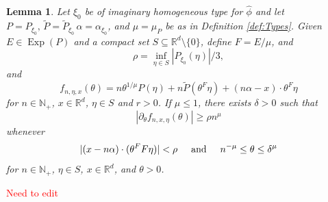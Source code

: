\documentclass[11pt]{article}
\newtheorem{lemma}[theorem]{Lemma}
\newcommand\Exp{\operatorname{Exp}}
\begin{document}
\begin{lemma}\label{lem:LwrBndDerivF}
Let $\xi_0$ be of imaginary homogeneous type for $\widehat{\phi}$ and let $P=P_{\xi_0},\,\widetilde{P}=\widetilde{P}_{\xi_0}\,\alpha=\alpha_{\xi_0}$, and $\mu=\mu_{P}$ be as in Definition \ref{def:Types}. Given $E\in \Exp(P)$ and a compact set $S\subseteq \mathbb{R}^d\setminus\{0\}$, define $F=E/\mu$, and
\begin{equation*}
    \rho=\inf_{\eta\in S}|P_{\xi_0}(\eta)|/3,
\end{equation*}
and
\begin{equation*}
    f_{n,\eta,x}(\theta)=n \theta^{1/\mu} P(\eta)+n\widetilde{P}(\theta^F\eta)+(n\alpha-x)\cdot \theta^F\eta
\end{equation*}
for $n\in\mathbb{N}_+$, $x\in\mathbb{R}^d$, $\eta\in S$ and $r>0$. If $\mu\leq 1$, there exists $\delta>0$ such that
\begin{equation*}
    |\partial_\theta f_{n,x,\eta}(\theta)|\geq \rho n^{\mu}
\end{equation*}
whenever
\begin{equation*}
    |(x-n\alpha)\cdot (\theta^F F \eta)|<\rho\hspace{.5cm}\mbox{and}\hspace{.5cm} n^{-\mu}\leq \theta\leq \delta^\mu
\end{equation*}
for $n\in\mathbb{N}_+$, $\eta\in S$,  $x\in\mathbb{R}^d$, and $\theta>0$.
\end{lemma}
\textcolor{red}{Need to edit}
\end{document}
